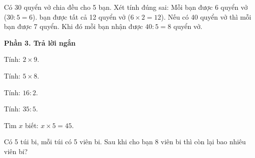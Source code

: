 \begin{ex} %
Có 30 quyển vở chia đều cho 5 bạn. Xét tính đúng sai:
\choiceTF
{\True Mỗi bạn được 6 quyển vở ($30 : 5 = 6$).}
{ bạn được tất cả 12 quyển vở ($6 \times 2 = 12$).}
{Nếu có 40 quyển vở thì mỗi bạn được 7 quyển.}
{\True Khi đó mỗi bạn nhận được $40 : 5 = 8$ quyển vở.}
\end{ex}

\textbf{Phần 3. Trả lời ngắn}

\begin{ex} %
Tính: $2 \times 9$.
\end{ex}

\begin{ex} %
Tính: $5 \times 8$.
\end{ex}

\begin{ex} %
Tính: $16 : 2$.
\end{ex}

\begin{ex} %
Tính: $35 : 5$.
\end{ex}

\begin{ex} %
Tìm $x$ biết: $x \times 5 = 45$.
\end{ex}

\begin{ex} %
Có 5 túi bi, mỗi túi có 5 viên bi. Sau khi cho bạn 8 viên bi thì còn lại bao nhiêu viên bi?
\end{ex}

